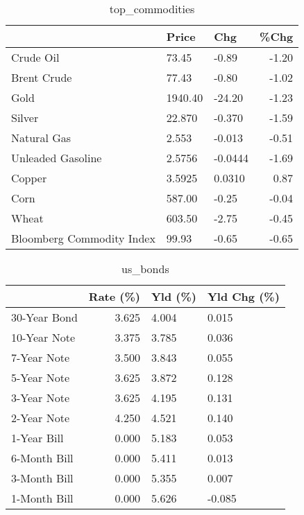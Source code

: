\documentclass{article}%
\begin{document}
\begin{table}[htbp]%
\caption{top\_commodities}%
\centering%
\begin{adjustbox}{width=1\textwidth}%
\begin{tabular}{lllr}
\toprule
                          &   Price &     Chg &  \%Chg \\
\midrule
               Crude Oil  &   73.45 &   -0.89 & -1.20 \\
             Brent Crude  &   77.43 &   -0.80 & -1.02 \\
                    Gold  & 1940.40 &  -24.20 & -1.23 \\
                  Silver  &  22.870 &  -0.370 & -1.59 \\
             Natural Gas  &   2.553 &  -0.013 & -0.51 \\
       Unleaded Gasoline  &  2.5756 & -0.0444 & -1.69 \\
                  Copper  &  3.5925 &  0.0310 &  0.87 \\
                    Corn  &  587.00 &   -0.25 & -0.04 \\
                   Wheat  &  603.50 &   -2.75 & -0.45 \\
Bloomberg Commodity Index &   99.93 &   -0.65 & -0.65 \\
\bottomrule
\end{tabular}
%
\end{adjustbox}%
\end{table}

%


\begin{table}[htbp]%
\caption{us\_bonds}%
\centering%
\begin{adjustbox}{width=1\textwidth}%
\begin{tabular}{lrll}
\toprule
             &  Rate (\%) & Yld (\%) & Yld Chg (\%) \\
\midrule
30-Year Bond &     3.625 &   4.004 &       0.015 \\
10-Year Note &     3.375 &   3.785 &       0.036 \\
 7-Year Note &     3.500 &   3.843 &       0.055 \\
 5-Year Note &     3.625 &   3.872 &       0.128 \\
 3-Year Note &     3.625 &   4.195 &       0.131 \\
 2-Year Note &     4.250 &   4.521 &       0.140 \\
 1-Year Bill &     0.000 &   5.183 &       0.053 \\
6-Month Bill &     0.000 &   5.411 &       0.013 \\
3-Month Bill &     0.000 &   5.355 &       0.007 \\
1-Month Bill &     0.000 &   5.626 &      -0.085 \\
\bottomrule
\end{tabular}
%
\end{adjustbox}%
\end{table}
\end{document}
